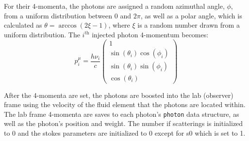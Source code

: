 \documentclass[12pt,a4paper]{article}
\begin{document}
For their 4-momenta, the photons are assigned a random azimuthal angle, $\phi$, from a uniform distribution between $0$ and $2\pi$, as well as a polar angle, which is calculated as $\theta=\arccos(2\xi-1)$, where $\xi$ is a random number drawn from a uniform distribution. The $i^\mathrm{th}$ injected photon 4-momentum becomes:
\[
p^\mu_i=\frac{h\nu_i}{c}\begin{pmatrix}
1 \\ \sin(\theta_i) \cos(\phi_i) \\ \sin(\theta_i) \sin(\phi_i) \\ \cos(\theta_i)
\end{pmatrix}
\]

After the 4-momenta are set, the photons are boosted into the lab (observer) frame using the velocity of the fluid element that the photons are located within. The lab frame 4-momenta are saves to each photon's \texttt{photon} data structure, as well as the photon's position and weight. The number if scatterings is initialized to 0 and the stokes parameters are initialized to 0 except for s0 which is set to 1.
\end{document}
